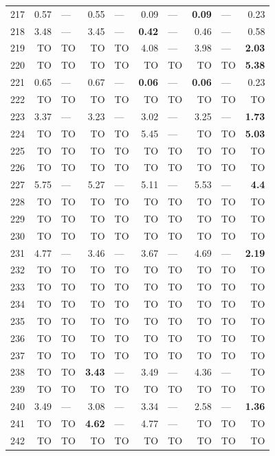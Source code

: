 \begin{longtable}{lr@{\hskip 4pt}l@{\hskip 12pt}r@{\hskip 4pt}l@{\hskip 12pt}r@{\hskip 4pt}l@{\hskip 12pt}r@{\hskip 4pt}l@{\hskip 12pt}r}
217 & 0.57 & --- & 0.55 & --- & 0.09 & --- & \textbf{0.09} & --- & 0.23 \\
218 & 3.48 & --- & 3.45 & --- & \textbf{0.42} & --- & 0.46 & --- & 0.58 \\
219 & TO & TO & TO & TO & 4.08 & --- & 3.98 & --- & \textbf{2.03} \\
220 & TO & TO & TO & TO & TO & TO & TO & TO & \textbf{5.38} \\
221 & 0.65 & --- & 0.67 & --- & \textbf{0.06} & --- & \textbf{0.06} & --- & 0.23 \\
222 & TO & TO & TO & TO & TO & TO & TO & TO & TO \\
223 & 3.37 & --- & 3.23 & --- & 3.02 & --- & 3.25 & --- & \textbf{1.73} \\
224 & TO & TO & TO & TO & 5.45 & --- & TO & TO & \textbf{5.03} \\
225 & TO & TO & TO & TO & TO & TO & TO & TO & TO \\
226 & TO & TO & TO & TO & TO & TO & TO & TO & TO \\
227 & 5.75 & --- & 5.27 & --- & 5.11 & --- & 5.53 & --- & \textbf{4.4} \\
228 & TO & TO & TO & TO & TO & TO & TO & TO & TO \\
229 & TO & TO & TO & TO & TO & TO & TO & TO & TO \\
230 & TO & TO & TO & TO & TO & TO & TO & TO & TO \\
231 & 4.77 & --- & 3.46 & --- & 3.67 & --- & 4.69 & --- & \textbf{2.19} \\
232 & TO & TO & TO & TO & TO & TO & TO & TO & TO \\
233 & TO & TO & TO & TO & TO & TO & TO & TO & TO \\
234 & TO & TO & TO & TO & TO & TO & TO & TO & TO \\
235 & TO & TO & TO & TO & TO & TO & TO & TO & TO \\
236 & TO & TO & TO & TO & TO & TO & TO & TO & TO \\
237 & TO & TO & TO & TO & TO & TO & TO & TO & TO \\
238 & TO & TO & \textbf{3.43} & --- & 3.49 & --- & 4.36 & --- & TO \\
239 & TO & TO & TO & TO & TO & TO & TO & TO & TO \\
240 & 3.49 & --- & 3.08 & --- & 3.34 & --- & 2.58 & --- & \textbf{1.36} \\
241 & TO & TO & \textbf{4.62} & --- & 4.77 & --- & TO & TO & TO \\
242 & TO & TO & TO & TO & TO & TO & TO & TO & TO \\

\end{longtable}
